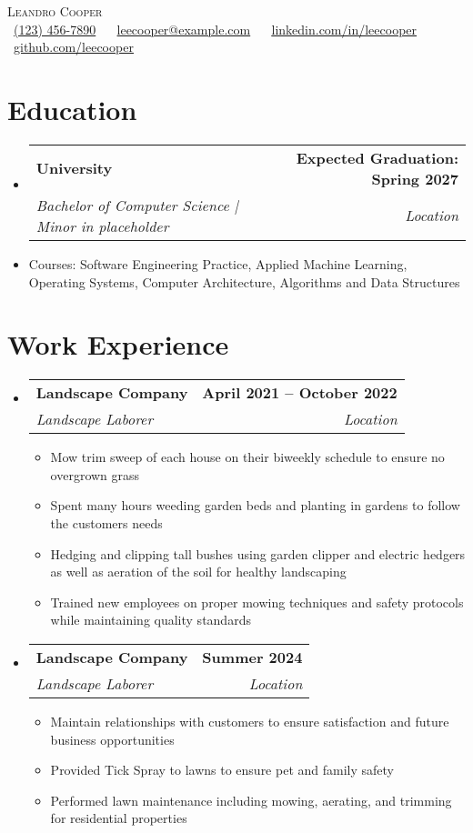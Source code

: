 \documentclass[letterpaper,11pt]{article}
\makeatletter
\newcommand{\resumeItem}[1]{
  \item\small{
    {#1 \vspace{0pt}}
  }
}
\newcommand{\resumeSubheading}[4]{
  \vspace{-2pt}\item
    \begin{tabular*}{1.0\textwidth}[t]{l@{\extracolsep{\fill}}r}
      \textbf{#1} & \textbf{\small #2} \\
      \textit{\small#3} & \textit{\small #4} \\
    \end{tabular*}\vspace{-7pt}
}
\newcommand{\resumeSubHeadingListStart}{\begin{itemize}[leftmargin=0.0in, label={}]}
\newcommand{\resumeSubHeadingListEnd}{\end{itemize}}\vspace{0pt}
\newcommand{\resumeItemListStart}{\begin{itemize}}
\newcommand{\resumeItemListEnd}{\end{itemize}\vspace{-5pt}}
\makeatother
\begin{document}
\begin{center}
    {\Large \scshape Leandro Cooper} \\[2mm]
    \footnotesize \raisebox{-0.1\height}
    \faPhone\ \underline{(123) 456-7890} ~ 
    {\faEnvelope\  \underline{leecooper@example.com}} ~ 
    {\faLinkedin\ \underline{\href{https://www.linkedin.com/in/leecooper/}{linkedin.com/in/leecooper}}} ~
    {\faGithub\ \underline{\href{https://github.com/leecooper29}{github.com/leecooper}}} 

    \vspace{-8pt}
\end{center}

\section{Education}
  \resumeSubHeadingListStart
    \resumeSubheading
      {University}{Expected Graduation: Spring 2027}
      {Bachelor of Computer Science | Minor in placeholder}{Location}
  \resumeSubHeadingListEnd
    \resumeItemListStart
        \resumeItem{Courses: Software Engineering Practice, Applied Machine Learning, Operating Systems, Computer Architecture, Algorithms and Data Structures}
    \resumeItemListEnd
    \vspace{-12pt}

\section{Work Experience}
    \resumeSubHeadingListStart
        \resumeSubheading{Landscape Company}{April 2021 – October 2022}{Landscape Laborer}{Location} 
            \resumeItemListStart
                \resumeItem{Mow trim sweep of each house on their biweekly schedule to ensure no overgrown grass}
                \resumeItem{Spent many hours weeding garden beds and planting in gardens to follow the customers needs}
                \resumeItem{Hedging and clipping tall bushes using garden clipper and electric hedgers as well as aeration of the soil for healthy landscaping}
                \resumeItem{Trained new employees on proper mowing techniques and safety protocols while maintaining quality standards}
            \resumeItemListEnd
            
        \resumeSubheading{Landscape Company}{Summer 2024}{Landscape Laborer}{Location} 
            \resumeItemListStart
                \resumeItem{Maintain relationships with customers to ensure satisfaction and future business opportunities}
                \resumeItem{Provided Tick Spray to lawns to ensure pet and family safety}
                \resumeItem{Performed lawn maintenance including mowing, aerating, and trimming for residential properties}
            \resumeItemListEnd
    \resumeSubHeadingListEnd
    \vspace{-12pt}
\end{document}
